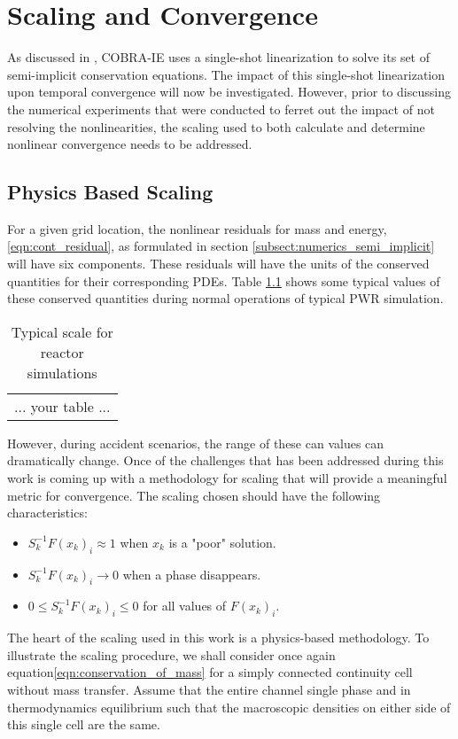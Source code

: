 \chapter{Scaling and Convergence}
\label{chap:scaling_and_convergence}
As discussed in , COBRA-IE uses a single-shot linearization to solve its set of semi-implicit conservation equations.
The impact of this single-shot linearization upon temporal convergence will now be investigated.
However, prior to discussing the numerical experiments that were conducted to ferret out the impact of not resolving the nonlinearities, the scaling used to both calculate and determine nonlinear convergence needs to be addressed.

\section{Physics Based Scaling}
\label{sect:scaling}
For a given grid location, the nonlinear residuals for mass and energy, \eqref{eqn:cont_residual}, as formulated in section \ref{subsect:numerics_semi_implicit} will have six components.
These residuals will have the units of the conserved quantities for their corresponding PDEs.
Table \ref{tab:scaling_units_scales} shows some typical values of these conserved quantities during normal operations of typical PWR simulation.

\begin{table}[ht]
\centering
\begin{tabular}{|l|}
... your table ...
\end{tabular}
\caption{Typical scale for reactor simulations}
\label{tab:scaling_units_scales}
\end{table}

However, during accident scenarios, the range of these can values can dramatically change.
Once of the challenges that has been addressed during this work is coming up with a methodology for scaling that will provide a meaningful metric for convergence.
The scaling chosen should have the following characteristics:
\begin{itemize}
\item{$S^{-1}_k F(x_k)_i \approx 1$ when $x_k$ is a "poor" solution.}
\item{$S^{-1}_k F(x_k)_i \rightarrow 0$ when a phase disappears.}
\item{$0 \leq S^{-1}_k F(x_k)_i \leq 0 $ for all values of $F(x_k)_i$.}
\end{itemize}

The heart of the scaling used in this work is a physics-based methodology.
To illustrate the scaling procedure, we shall consider once again equation\ref{eqn:conservation_of_mass} for a simply connected continuity cell without mass transfer.
Assume that the entire channel single phase and in thermodynamics equilibrium such that the macroscopic densities on either side of this single cell are the same.

